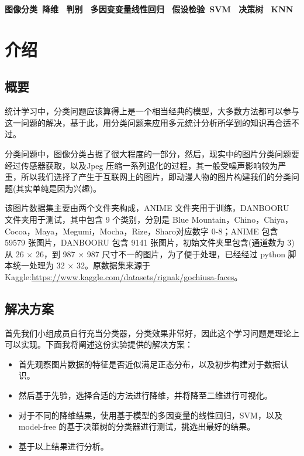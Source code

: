 \documentclass[fleqn]{Paquetes/RevDigMatEduInt}
\begin{document}
	
	\maketitle


\begin{keywords}
	\bfseries{\textcolor{azulTitulos}{图像分类\ 降维 \ 判别 \ 多因变变量线性回归 \ 假设检验\ SVM \ 决策树 \ KNN }}
\end{keywords}

\section{介绍}
\subsection{概要}
统计学习中，分类问题应该算得上是一个相当经典的模型，大多数方法都可以参与这一问题的解决，基于此，用分类问题来应用多元统计分析所学到的知识再合适不过。

分类问题中，图像分类占据了很大程度的一部分，然后，现实中的图片分类问题要经过传感器获取，以及Jpeg 压缩一系列退化的过程，其一般受噪声影响较为严重，所以我们选择了产生于互联网上的图片，即动漫人物的图片构建我们的分类问题(其实单纯是因为兴趣)。

该图片数据集主要由两个文件夹构成，ANIME 文件夹用于训练，DANBOORU 文件夹用于测试，其中包含 9 个类别，分别是 Blue Mountain，Chino，Chiya，Cocoa，Maya，Megumi，Mocha，Rize，Sharo对应数字 0-8；ANIME 包含 59579 张图片，DANBOORU 包含 9141 张图片，初始文件夹里包含(通道数为 $3$)从 26 $\times $ 26，到 987 $\times$ 987 尺寸不一的图片，为了便于处理，已经经过 python 脚本统一处理为 32 $\times $ 32。原数据集来源于 Kaggle:\href{https://www.kaggle.com/datasets/rignak/gochiusa-faces}{\url{https://www.kaggle.com/datasets/rignak/gochiusa-faces}}。

\subsection{解决方案}

首先我们小组成员自行充当分类器，分类效果非常好，因此这个学习问题是理论上可以实现。下面我将阐述这份实验提供的解决方案：

\begin{nota}

\begin{itemize}
	\item 首先观察图片数据的特征是否近似满足正态分布，以及初步构建对于数据认识。
	\item 然后基于先验，选择合适的方法进行降维，并将降至二维进行可视化。
	\item 对于不同的降维结果，使用基于模型的多因变量的线性回归，SVM，以及 model-free 的基于决策树的分类器进行测试，挑选出最好的结果。
	\item 基于以上结果进行分析。
\end{itemize}
\end{nota}
\end{document}
